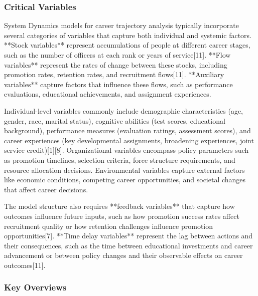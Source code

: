 \documentclass[main.tex]{subfiles}
\begin{document}
\subsubsection{Critical Variables}

System Dynamics models for career trajectory analysis typically incorporate several categories of variables that capture both individual and systemic factors. **Stock variables** represent accumulations of people at different career stages, such as the number of officers at each rank or years of service[11]. **Flow variables** represent the rates of change between these stocks, including promotion rates, retention rates, and recruitment flows[11]. **Auxiliary variables** capture factors that influence these flows, such as performance evaluations, educational achievements, and assignment experiences.

Individual-level variables commonly include demographic characteristics (age, gender, race, marital status), cognitive abilities (test scores, educational background), performance measures (evaluation ratings, assessment scores), and career experiences (key developmental assignments, broadening experiences, joint service credit)[1][8]. Organizational variables encompass policy parameters such as promotion timelines, selection criteria, force structure requirements, and resource allocation decisions. Environmental variables capture external factors like economic conditions, competing career opportunities, and societal changes that affect career decisions.

The model structure also requires **feedback variables** that capture how outcomes influence future inputs, such as how promotion success rates affect recruitment quality or how retention challenges influence promotion opportunities[7]. **Time delay variables** represent the lag between actions and their consequences, such as the time between educational investments and career advancement or between policy changes and their observable effects on career outcomes[11].

\subsubsection{Key Overviews}

\end{document}
